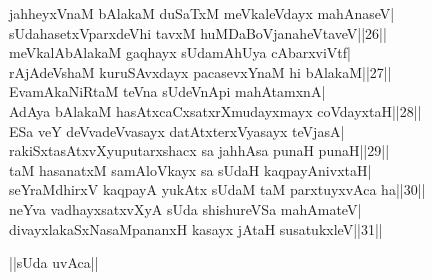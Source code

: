 \documentclass{article}
\begin{document}
jahheyxVnaM bAlakaM duSaTxM meVkaleVdayx mahAnaseV|\\
sUdahasetxVparxdeVhi tavxM huMDaBoVjanaheVtaveV||26||\\
meVkalAbAlakaM gaqhayx sUdamAhUya cAbarxviVtf|\\
rAjAdeVshaM kuruSAvxdayx pacasevxYnaM hi bAlakaM||27||\\
EvamAkaNiRtaM teVna sUdeVnApi mahAtamxnA|\\
AdAya bAlakaM hasAtxcaCxsatxrXmudayxmayx coVdayxtaH||28||\\
ESa veY deVvadeVvasayx datAtxterxVyasayx teVjasA|\\
rakiSxtasAtxvXyuputarxshacx sa jahhAsa punaH punaH||29||\\
taM hasanatxM samAloVkayx sa sUdaH kaqpayAnivxtaH|\\
seYraMdhirxV kaqpayA yukAtx sUdaM taM parxtuyxvAca ha||30||\\
neYva vadhayxsatxvXyA sUda shishureVSa mahAmateV|\\
divayxlakaSxNasaMpananxH kasayx jAtaH susatukxleV||31||\\

\begin{center}
||sUda uvAca||
\end{center}
\end{document}
